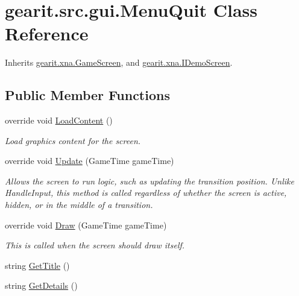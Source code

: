 \hypertarget{classgearit_1_1src_1_1gui_1_1_menu_quit}{\section{gearit.\+src.\+gui.\+Menu\+Quit Class Reference}
\label{classgearit_1_1src_1_1gui_1_1_menu_quit}
}


Inherits \hyperlink{classgearit_1_1xna_1_1_game_screen}{gearit.\+xna.\+Game\+Screen}, and \hyperlink{interfacegearit_1_1xna_1_1_i_demo_screen}{gearit.\+xna.\+I\+Demo\+Screen}.

\subsection*{Public Member Functions}
\begin{DoxyCompactItemize}
\item 
override void \hyperlink{classgearit_1_1src_1_1gui_1_1_menu_quit_a0c1770399b83c061ee5fcfd4f0c0c249}{Load\+Content} ()
\begin{DoxyCompactList}\small\item\em Load graphics content for the screen. \end{DoxyCompactList}\item 
override void \hyperlink{classgearit_1_1src_1_1gui_1_1_menu_quit_a07991e7df76bb3932034457b9c29380b}{Update} (Game\+Time game\+Time)
\begin{DoxyCompactList}\small\item\em Allows the screen to run logic, such as updating the transition position. Unlike Handle\+Input, this method is called regardless of whether the screen is active, hidden, or in the middle of a transition. \end{DoxyCompactList}\item 
override void \hyperlink{classgearit_1_1src_1_1gui_1_1_menu_quit_af9e42d48df24405334155b3c4f4cccf6}{Draw} (Game\+Time game\+Time)
\begin{DoxyCompactList}\small\item\em This is called when the screen should draw itself. \end{DoxyCompactList}\item 
string \hyperlink{classgearit_1_1src_1_1gui_1_1_menu_quit_a76eb754ddc6a5589d2481b550f05965d}{Get\+Title} ()
\item 
string \hyperlink{classgearit_1_1src_1_1gui_1_1_menu_quit_a225626f0b2fe2c8fb4caa7a7dce1e240}{Get\+Details} ()
\end{DoxyCompactItemize}
